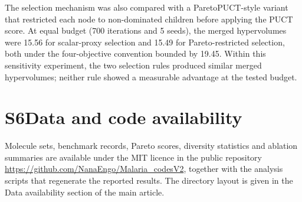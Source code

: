 \documentclass[10pt,a4paper]{article}
\begin{document}
The selection mechanism was also compared with a ParetoPUCT-style variant that restricted each node to non-dominated children before applying the PUCT score. At equal budget (\num{700} iterations and \num{5} seeds), the merged hypervolumes were \num{15.56} for scalar-proxy selection and \num{15.49} for Pareto-restricted selection, both under the four-objective convention bounded by \num{19.45}. Within this sensitivity experiment, the two selection rules produced similar merged hypervolumes; neither rule showed a measurable advantage at the tested budget.

\section*{S6\hspace{0.6em}Data and code availability}

Molecule sets, benchmark records, Pareto scores, diversity statistics and ablation summaries are available under the MIT licence in the public repository \url{https://github.com/NanaEngo/Malaria_codesV2}, together with the analysis scripts that regenerate the reported results. The directory layout is given in the Data availability section of the main article.
\end{document}
